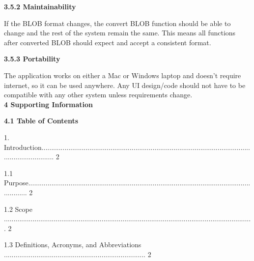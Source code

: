 \documentclass[10pt,draftclsnofoot,onecolumn]{IEEEtran}
\newcommand\tab[1][1cm]{\hspace*{#1}}
\begin{document}
    \vspace{5mm}
 {\Medium\textbf{3.5.2 Maintainability}} \\
     \vspace{5mm}

If the BLOB format changes, the convert BLOB function should be able to change and the rest of the system remain the same. This means all functions after converted BLOB should expect and accept a consistent format.\\
    \vspace{5mm}
    
     {\Medium\textbf{3.5.3 Portability}} \\
     \vspace{5mm}

The application works on either a Mac or Windows laptop and doesn't require internet, so it can be used anywhere. 
 \vspace{2mm}
Any UI design/code should not have to be compatible with any other system unless requirements change.\\
    \vspace{5mm}
 {\Large\textbf{4 Supporting Information}} \\
     \vspace{5mm}

     {\Medium\textbf{4.1 Table of Contents}} \\
          \vspace{5mm}

1. Introduction....................................................................................................................................... 2\\
          \vspace{5mm}

   \tab 1.1 Purpose................................................................................................................................ 2\\
              \vspace{5mm}

   \tab 1.2 Scope .................................................................................................................................. 2\\
                 \vspace{5mm}

   \tab 1.3 Definitions, Acronyms, and Abbreviations .......................................................................... 2\\
                   
\end{document}
